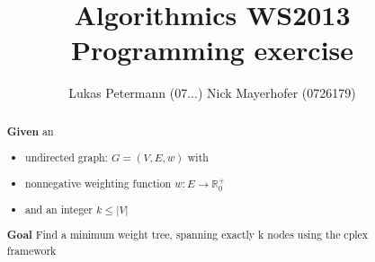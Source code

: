 \documentclass[a4paper,11pt]{article}
\title{Algorithmics WS2013 Programming exercise}
\author{Lukas Petermann (07...) \quad Nick Mayerhofer (0726179)}
\begin{document}
\maketitle
\tableofcontents

\begin{abstract}
\textbf{Given} an 
\begin{itemize}
  \item undirected graph: $G=(V,E,w)$ with
  \item nonnegative weighting function $ w : E \rightarrow \mathbb{R}_0^+$
  \item and an integer $k \leq |V|$
\end{itemize}

\textbf{Goal}
Find a minimum weight tree, spanning exactly k nodes using the cplex framework
\end{abstract}






\end{document}
